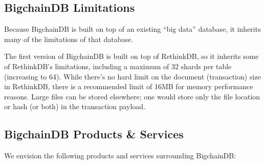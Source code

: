 \subsection{BigchainDB Limitations}
Because BigchainDB is built on top of an existing ``big data'' database, it inherits many of the limitations of that database.

The first version of BigchainDB is built on top of RethinkDB, so it inherits some of RethinkDB's limitations, including a maximum of 32 shards per table (increasing to 64). While there's no hard limit on the document (transaction) size in RethinkDB, there is a recommended limit of 16MB for memory performance reasons. Large files can be stored elsewhere; one would store only the file location or hash (or both) in the transaction payload.

\subsection{BigchainDB Products \& Services}
We envision the following products and services surrounding BigchainDB:
